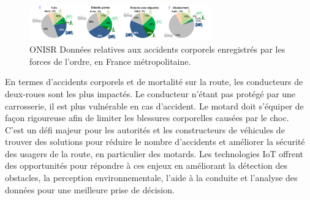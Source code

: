 \documentclass{article}
\begin{document}
\begin{figure}[h]
    \centering
    \includegraphics[width=0.7\textwidth]{images/camambert_accidents_differents_vehicules.png} 
    \caption{ONISR Données relatives aux accidents corporels enregistrés par les forces de l'ordre, en France métropolitaine.}
\end{figure}

En termes d’accidents corporels et de mortalité sur la route, les conducteurs de deux-roues sont les plus impactés. Le conducteur n’étant pas protégé par une carrosserie, il est plus vulnérable en cas d’accident. Le motard doit s’équiper de façon rigoureuse afin de limiter les blessures corporelles causées par le choc.\\
C'est un défi majeur pour les autorités et les constructeurs de véhicules de trouver des solutions pour réduire le nombre d'accidents et améliorer la sécurité des usagers de la route, en particulier des motards. Les technologies IoT offrent des opportunités pour répondre à ces enjeux en améliorant la détection des obstacles, la perception environnementale, l'aide à la conduite et l'analyse des données pour une meilleure prise de décision.\\
\end{document}
